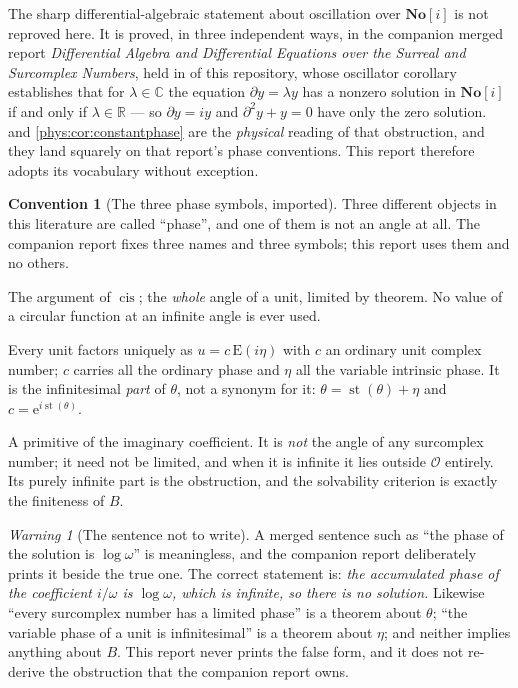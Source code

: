 \documentclass[11pt,letterpaper]{article}
\numberwithin{equation}{section}
\theoremstyle{definition}
\newtheorem{convention}[theorem]{Convention}
\theoremstyle{remark}
\newtheorem{warning}[theorem]{Warning}
\newcommand{\SC}{\mathbf{No}[i]}
\newcommand{\R}{\mathbb R}
\newcommand{\C}{\mathbb C}
\newcommand{\Ofin}{\mathcal O}
\newcommand{\mm}{\mathfrak m}
\DeclareMathOperator{\st}{st}
\DeclareMathOperator{\cis}{cis}
\newcommand{\ee}{\mathrm e}
\newcommand{\Emm}{\mathrm{E}}
\begin{document}
The sharp differential-algebraic statement about oscillation over $\SC$ is not
reproved here. It is proved, in three independent ways, in the companion merged
report \emph{Differential Algebra and Differential Equations over the Surreal
and Surcomplex Numbers}, held in
of this repository, whose oscillator corollary establishes that for
$\lambda\in\C$ the equation $\partial y=\lambda y$ has a nonzero solution in
$\SC$ if and only if $\lambda\in\R$ --- so $\partial y=iy$ and
$\partial^{2}y+y=0$ have only the zero solution.  and
\cref{phys:cor:constantphase} are the \emph{physical} reading of that
obstruction, and they land squarely on that report's phase conventions. This
report therefore adopts its vocabulary without exception.

\begin{convention}[The three phase symbols, imported]
\label{phys:conv:phases}
Three different objects in this literature are called ``phase'', and one of
them is not an angle at all. The companion report fixes three names and three
symbols; this report uses them and no others.
\begin{description}[style=nextline,leftmargin=0pt,labelsep=0pt]
\item[The finite angle $\theta$, living in $\Ofin$.]
The argument of $\cis$; the \emph{whole} angle of a unit, limited by theorem.
No value of a circular function at an infinite angle is ever used.
\item[The infinitesimal phase residue $\eta$, living in $\mm$.]
Every unit factors uniquely as $u=c\,\Emm(i\eta)$ with $c$ an ordinary unit
complex number; $c$ carries all the ordinary phase and $\eta$ all the variable
intrinsic phase. It is the infinitesimal \emph{part} of $\theta$, not a synonym
for it: $\theta=\st(\theta)+\eta$ and $c=\ee^{i\st(\theta)}$.
\item[The accumulated phase $B$, an arbitrary surreal.]
A primitive of the imaginary coefficient. It is \emph{not} the angle of any
surcomplex number; it need not be limited, and when it is infinite it lies
outside $\Ofin$ entirely. Its purely infinite part is the obstruction, and the
solvability criterion is exactly the finiteness of $B$.
\end{description}
\end{convention}

\begin{warning}[The sentence not to write]
\label{phys:warn:phase}
A merged sentence such as ``the phase of the solution is $\log\omega$'' is
meaningless, and the companion report deliberately prints it beside the true
one. The correct statement is: \emph{the accumulated phase of the coefficient
$i/\omega$ is $\log\omega$, which is infinite, so there is no solution.}
Likewise ``every surcomplex number has a limited phase'' is a theorem about
$\theta$; ``the variable phase of a unit is infinitesimal'' is a theorem about
$\eta$; and neither implies anything about $B$. This report never prints the
false form, and it does not re-derive the obstruction that the companion report
owns.
\end{warning}
\end{document}
